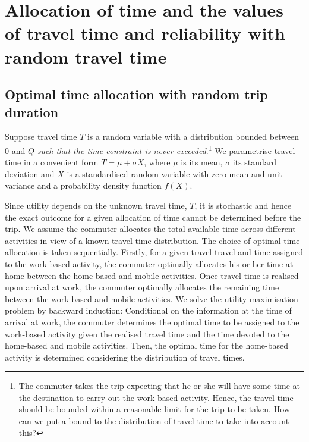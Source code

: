 \documentclass[12pt,a4paper,british]{article}
\begin{document}
\section{Allocation of time and the values of travel time and reliability with random travel time }

\subsection*{Optimal time allocation with random trip duration}

Suppose travel time $T$ is a random variable with a distribution bounded between $0$ and $Q$ \textit{such that the time constraint is never exceeded}.\footnote{The commuter takes the trip expecting that he or she will have some time at the destination to carry out the work-based activity. Hence, the travel time should be bounded within a reasonable limit for the trip to be taken. How can we put a bound to the distribution of travel time to take into account this?} We parametrise travel time in a convenient form $T=\mu+\sigma X$, where $\mu$ is its mean, $\sigma$ its standard deviation and $X$ is a standardised random variable with zero mean and unit variance and a probability density function $f\left(X\right)$.

Since utility depends on the unknown travel time, $T$, it is stochastic and hence the exact outcome for a given allocation of time cannot be determined before the trip. We assume the commuter allocates the total available time across different activities in view of a known travel time distribution. The choice of optimal time allocation is taken sequentially. Firstly, for a given travel travel and time assigned to the work-based activity, the commuter optimally allocates his or her time at home between the home-based and mobile activities. Once travel time is realised upon arrival at work, the commuter optimally allocates the remaining time between the work-based and mobile activities. We solve the utility maximisation problem by backward induction: Conditional on the information at the time of arrival at work, the commuter determines the optimal time to be assigned to the work-based activity given the realised travel time and the time devoted to the home-based and mobile activities. Then, the optimal time for the home-based activity is determined considering the distribution of travel times.
\end{document}
